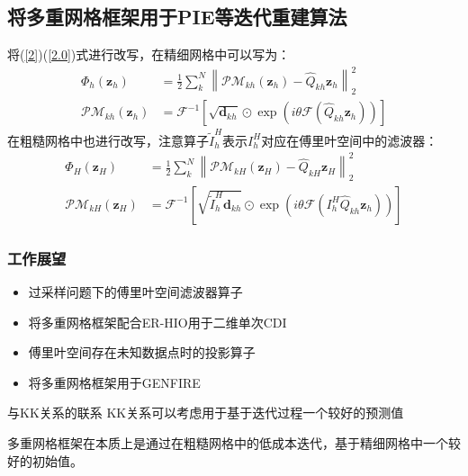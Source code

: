 \documentclass[10pt,aspectratio=169]{beamer} %
\renewcommand{\vec}[1]{\boldsymbol{#1}} %
\begin{document}
\subsection{将多重网格框架用于PIE等迭代重建算法}

\begin{frame}
    将(\ref{2})(\ref{2.0})式进行改写，在精细网格中可以写为：
    \begin{align*}
        \Phi_h (\vec{z}_h) & =\frac{1}{2}\sum_k^N \left\lVert \mathcal{PM}_{kh}(\vec{z}_h)-\hat{Q}_{kh} \vec{z}_h \right\rVert _2^2 \\
        \mathcal{PM}_{kh}(\vec{z}_h)&=\mathcal{F}^{-1} \left[\sqrt{\vec{d}_{kh}}\odot \exp{(i \theta \mathcal{F}(\hat{Q}_{kh} \vec{z}_h))}\right]
    \end{align*}
    在粗糙网格中也进行改写，注意算子$\tilde{I}_h^H$表示$I_h^H$对应在傅里叶空间中的滤波器：
    \begin{align*}
        \Phi_H (\vec{z}_H) & =\frac{1}{2}\sum_k^N \left\lVert \mathcal{PM}_{kH}(\vec{z}_H)-\hat{Q}_{kH} \vec{z}_H \right\rVert _2^2 \\
        \mathcal{PM}_{kH}(\vec{z}_H)&=\mathcal{F}^{-1} \left[\sqrt{\tilde{I}_h^H\vec{d}_{kh}}\odot \exp{(i \theta \mathcal{F}(I_h^H \hat{Q}_{kh} \vec{z}_h))}\right]
    \end{align*}
\end{frame}

\begin{frame}
    \frametitle{工作展望}
    \begin{itemize}
        \item 过采样问题下的傅里叶空间滤波器算子
        \item 将多重网格框架配合ER-HIO用于二维单次CDI
        \item 傅里叶空间存在未知数据点时的投影算子
        \item 将多重网格框架用于GENFIRE
    \end{itemize}
    \begin{block}{与KK关系的联系}
        KK关系可以考虑用于基于迭代过程一个较好的预测值
        
        多重网格框架在本质上是通过在粗糙网格中的低成本迭代，基于精细网格中一个较好的初始值。
    \end{block}

\end{frame}
\end{document}

